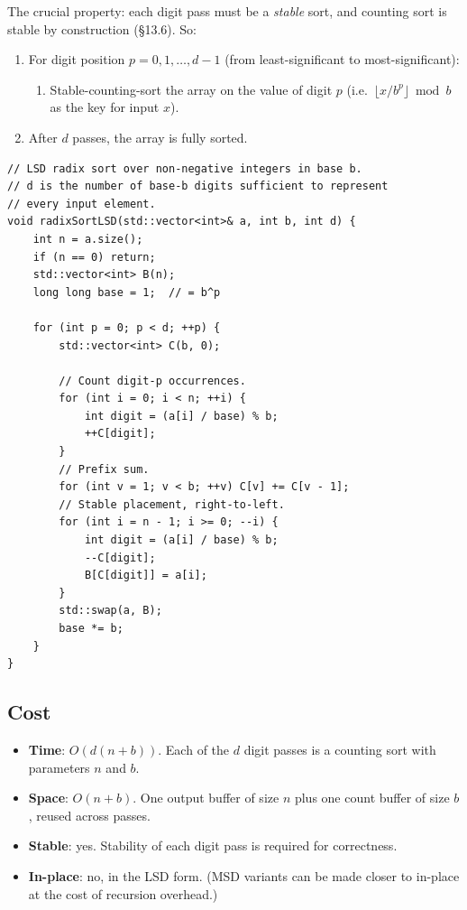 \documentclass[11pt]{article}
\begin{document}
The crucial property: each digit pass must be a \emph{stable}
sort, and counting sort is stable by construction (\S13.6). So:

\begin{enumerate}[leftmargin=*]
    \item For digit position $p = 0, 1, \dots, d-1$ (from
          least-significant to most-significant):
          \begin{enumerate}
              \item Stable-counting-sort the array on the value
                    of digit $p$ (i.e.\ $\lfloor x / b^p \rfloor
                    \bmod b$ as the key for input $x$).
          \end{enumerate}
    \item After $d$ passes, the array is fully sorted.
\end{enumerate}

\begin{lstlisting}[basicstyle=\ttfamily\small,frame=single]
// LSD radix sort over non-negative integers in base b.
// d is the number of base-b digits sufficient to represent
// every input element.
void radixSortLSD(std::vector<int>& a, int b, int d) {
    int n = a.size();
    if (n == 0) return;
    std::vector<int> B(n);
    long long base = 1;  // = b^p

    for (int p = 0; p < d; ++p) {
        std::vector<int> C(b, 0);

        // Count digit-p occurrences.
        for (int i = 0; i < n; ++i) {
            int digit = (a[i] / base) % b;
            ++C[digit];
        }
        // Prefix sum.
        for (int v = 1; v < b; ++v) C[v] += C[v - 1];
        // Stable placement, right-to-left.
        for (int i = n - 1; i >= 0; --i) {
            int digit = (a[i] / base) % b;
            --C[digit];
            B[C[digit]] = a[i];
        }
        std::swap(a, B);
        base *= b;
    }
}
\end{lstlisting}

\subsection*{Cost}

\begin{itemize}[leftmargin=*]
    \item \textbf{Time}: $O(d(n + b))$. Each of the $d$ digit
          passes is a counting sort with parameters $n$ and $b$.
    \item \textbf{Space}: $O(n + b)$. One output buffer of size
          $n$ plus one count buffer of size $b$, reused across
          passes.
    \item \textbf{Stable}: yes. Stability of each digit pass is
          required for correctness.
    \item \textbf{In-place}: no, in the LSD form. (MSD variants
          can be made closer to in-place at the cost of recursion
          overhead.)
\end{itemize}
\end{document}
